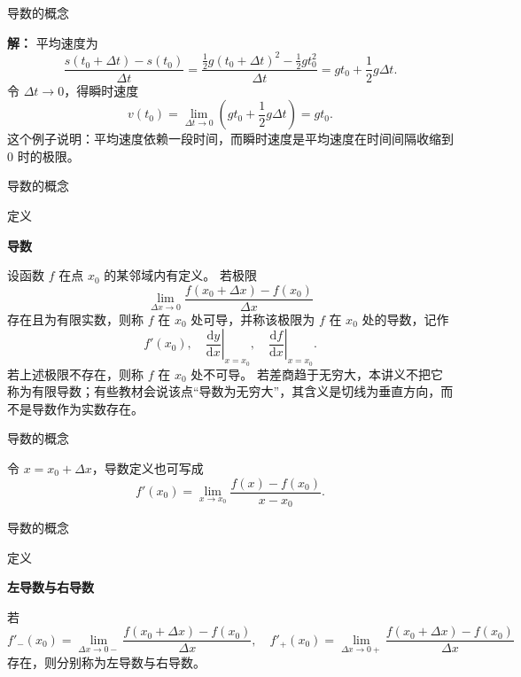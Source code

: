 \documentclass[aspectratio=169,10pt,fontset=fandol]{ctexbeamer}
\newcommand{\dd}{\mathrm{d}}
\begin{document}
\begin{frame}[t,fragile]{导数的概念}
\footnotesize
{\footnotesize
\textbf{解：}
平均速度为
\[
\frac{s(t_0+\Delta t)-s(t_0)}{\Delta t}
=\frac{\frac12g(t_0+\Delta t)^2-\frac12gt_0^2}{\Delta t}
=gt_0+\frac12g\Delta t.
\]
令 $\Delta t\to0$，得瞬时速度
\[
v(t_0)=\lim_{\Delta t\to0}\left(gt_0+\frac12g\Delta t\right)=gt_0.
\]
这个例子说明：平均速度依赖一段时间，而瞬时速度是平均速度在时间间隔收缩到 $0$ 时的极限。

}
\end{frame}
\begin{frame}[t,fragile]{导数的概念}
\footnotesize
\begin{block}{定义}
{\footnotesize
\textbf{导数}\par

设函数 $f$ 在点 $x_0$ 的某邻域内有定义。 若极限
\[
\lim_{\Delta x\to0}\frac{f(x_0+\Delta x)-f(x_0)}{\Delta x}
\]
存在且为有限实数，则称 $f$ 在 $x_0$ 处可导，并称该极限为 $f$ 在 $x_0$ 处的导数，记作
\[
f'(x_0),\quad \left.\frac{\dd y}{\dd x}\right|_{x=x_0},\quad \left.\frac{\dd f}{\dd x}\right|_{x=x_0}.
\]
若上述极限不存在，则称 $f$ 在 $x_0$ 处不可导。 若差商趋于无穷大，本讲义不把它称为有限导数；有些教材会说该点“导数为无穷大”，其含义是切线为垂直方向，而不是导数作为实数存在。

}
\end{block}
\end{frame}
\begin{frame}[t,fragile]{导数的概念}
\footnotesize
{\footnotesize
令 $x=x_0+\Delta x$，导数定义也可写成
\[
f'(x_0)=\lim_{x\to x_0}\frac{f(x)-f(x_0)}{x-x_0}.
\]


}
\end{frame}
\begin{frame}[t,fragile]{导数的概念}
\footnotesize
\begin{block}{定义}
{\footnotesize
\textbf{左导数与右导数}\par

若
\[
f'_-(x_0)=\lim_{\Delta x\to0-}\frac{f(x_0+\Delta x)-f(x_0)}{\Delta x},\quad
f'_+(x_0)=\lim_{\Delta x\to0+}\frac{f(x_0+\Delta x)-f(x_0)}{\Delta x}
\]
存在，则分别称为左导数与右导数。

}
\end{block}
\end{frame}
\end{document}
